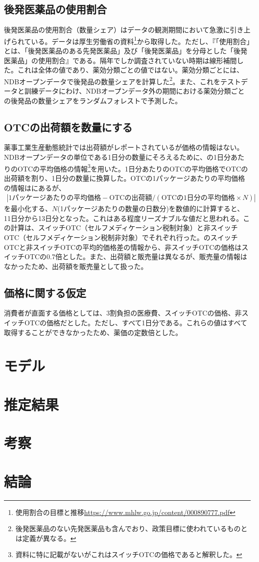 \documentclass[a4paper,12pt,uplatex]{jsarticle}
\let\l\left
\let\r\right
\theoremstyle{definition}
\begin{document}
\subsection{後発医薬品の使用割合}
後発医薬品の使用割合（数量シェア）はデータの観測期間において急激に引き上げられている。データは厚生労働省の資料\footnote{使用割合の目標と推移\url{https://www.mhlw.go.jp/content/000890777.pdf}}から取得した。ただし、『「使用割合」とは、「後発医薬品のある先発医薬品」及び「後発医薬品」を分母とした「後発医薬品」の使用割合』である。隔年でしか調査されていない時期は線形補間した。これは全体の値であり、薬効分類ごとの値ではない。薬効分類ごとには、NDBオープンデータで後発品の数量シェアを計算した\footnote{後発医薬品のない先発医薬品も含んでおり、政策目標に使われているものとは定義が異なる。}。また、これをテストデータと訓練データにわけ、NDBオープンデータ外の期間における薬効分類ごとの後発品の数量シェアをランダムフォレストで予測した。
\subsection{OTCの出荷額を数量にする}
薬事工業生産動態統計では出荷額がレポートされているが価格の情報はない。NDBオープンデータの単位である1日分の数量にそろえるために、\cite{igarashi2021}の1日分あたりのOTCの平均価格の情報\footnote{資料に特に記載がないがこれはスイッチOTCの価格であると解釈した。}を用いた。1日分あたりのOTCの平均価格でOTCの出荷額を割り、1日分の数量に換算した。OTCの1パッケージあたりの平均価格の情報は\cite{iseikyoku2021}にあるが、
\begin{align*}
\l|\textrm{1パッケージあたりの平均価格}-\textrm{OTCの出荷額}/(\textrm{OTCの1日分の平均価格}\times N)\r|
\end{align*}
を最小化する、\(N\)(1パッケージあたりの数量の日数分)を数値的に計算すると、11日分から13日分となった。これはある程度リーズナブルな値だと思われる。この計算は、スイッチOTC（セルフメディケーション税制対象）と非スイッチOTC（セルフメディケーション税制非対象）でそれぞれ行った。\cite{iseikyoku2021}のスイッチOTCと非スイッチOTCの平均的価格差の情報から、非スイッチOTCの価格はスイッチOTCの0.7倍とした。また、出荷額と販売量は異なるが、販売量の情報はなかったため、出荷額を販売量として扱った。
\subsection{価格に関する仮定}
消費者が直面する価格としては、3割負担の医療費、スイッチOTCの価格、非スイッチOTCの価格だとした。ただし、すべて1日分である。これらの値はすべて取得することができなかったため、薬価の定数倍とした。 
\section{モデル}
\section{推定結果}
\section{考察}

\section{結論}  

\newpage

\end{document}
